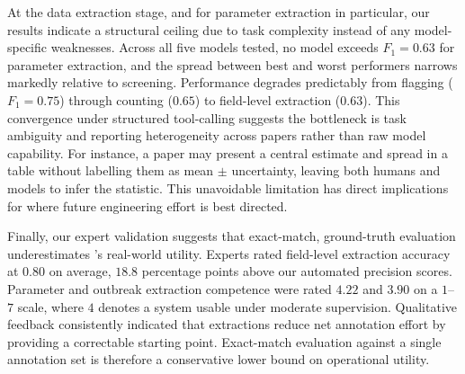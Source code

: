 At the data extraction stage, and for parameter extraction in particular, our results indicate a structural ceiling due to task complexity instead of any model-specific weaknesses. Across all five models tested, no model exceeds $F_1 = 0.63$ for parameter extraction, and the spread between best and worst performers narrows markedly relative to screening. Performance degrades predictably from flagging ($F_1 = 0.75$) through counting ($0.65$) to field-level extraction ($0.63$). This convergence under structured tool-calling suggests the bottleneck is task ambiguity and reporting heterogeneity across papers rather than raw model capability. For instance, a paper may present a central estimate and spread in a table without labelling them as mean $\pm$ uncertainty, leaving both humans and models to infer the statistic. This unavoidable limitation has direct implications for where future engineering effort is best directed.







Finally, our expert validation suggests that exact-match, ground-truth evaluation underestimates \name{}'s real-world utility.
Experts rated field-level extraction accuracy at $0.80$ on average, $18.8$ percentage points above our automated precision scores. Parameter and outbreak extraction competence were rated $4.22$ and $3.90$ on a $1$--$7$ scale, where $4$ denotes a system usable under moderate supervision. Qualitative feedback consistently indicated that \name{} extractions reduce net annotation effort by providing a correctable starting point. %
Exact-match evaluation against a single annotation set is therefore a conservative lower bound on operational utility.


